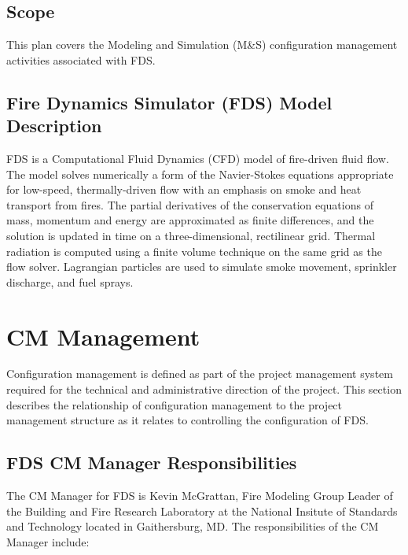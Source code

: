 \documentclass[11pt]{book}
\begin{document}
\section{Scope}

This plan covers the Modeling and Simulation (M\&S) configuration management activities associated with FDS.

\section{Fire Dynamics Simulator (FDS) Model Description}

FDS is a Computational Fluid Dynamics (CFD) model of fire-driven fluid flow.
The model solves numerically a form of the Navier-Stokes equations appropriate
for low-speed, thermally-driven flow with an emphasis on smoke and heat transport
from fires. The partial derivatives of the conservation equations of mass, momentum and energy are approximated
as finite differences, and the solution is updated in time on a three-dimensional, rectilinear grid.
Thermal radiation is computed using a finite volume technique on the same grid as the flow solver.
Lagrangian particles are used to simulate smoke movement, sprinkler discharge, and fuel sprays.

\chapter{CM Management}

Configuration management is defined as part of the project management system required for the technical and
administrative direction of the project.  This section describes the relationship of configuration management
to the project management structure as it relates to controlling the configuration of FDS.

\section{FDS CM Manager Responsibilities}

The CM Manager for FDS is Kevin McGrattan, Fire Modeling Group Leader of the Building and Fire Research
Laboratory at the National Insitute of Standards and Technology located in Gaithersburg, MD.  The responsibilities
of the CM Manager include:
\end{document}
